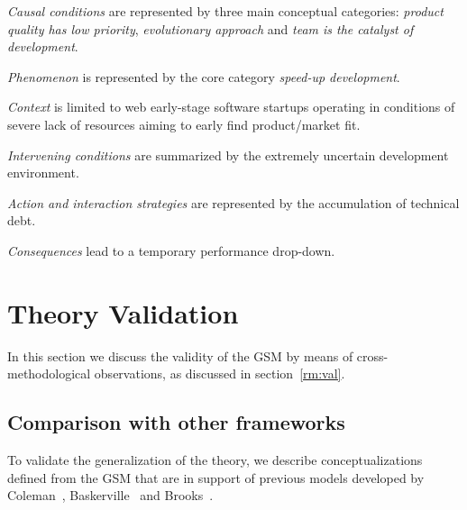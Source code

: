 \documentclass[10pt,journal,letterpaper,compsoc]{IEEEtran}
\begin{document}
\begin{compactitem}

\item \textit{Causal conditions} are represented by three main conceptual
categories: \textit{product quality has low priority}, \textit{evolutionary
approach} and \textit{team is the catalyst of development}. 
\item \textit{Phenomenon} is represented by the core category \textit{speed-up
development}. 
\item \textit{Context} is limited to web early-stage software startups 
operating in conditions of severe lack of resources aiming to early
find product/market fit. 
\item \textit{Intervening conditions} are summarized by the extremely 
uncertain development environment. 
\item \textit{Action and interaction strategies} are represented by the 
accumulation of technical debt.
\item \textit{Consequences} lead to a temporary performance drop-down.
\end{compactitem}

\section{Theory Validation} \label{res:val}

In this section we discuss the validity of the GSM by means of 
cross-methodological observations, as discussed in section~\ref{rm:val}. 


\subsection{Comparison with other frameworks}
\label{sect:theory:validation:others}

To validate the generalization of the theory, we describe conceptualizations
defined from the GSM that are in support of previous models developed by
Coleman~\cite{Coleman2007,Coleman2008a, Coleman2008}, 
Baskerville~\cite{Internet} and Brooks~\cite{BrooksJr1987}.
\end{document}
